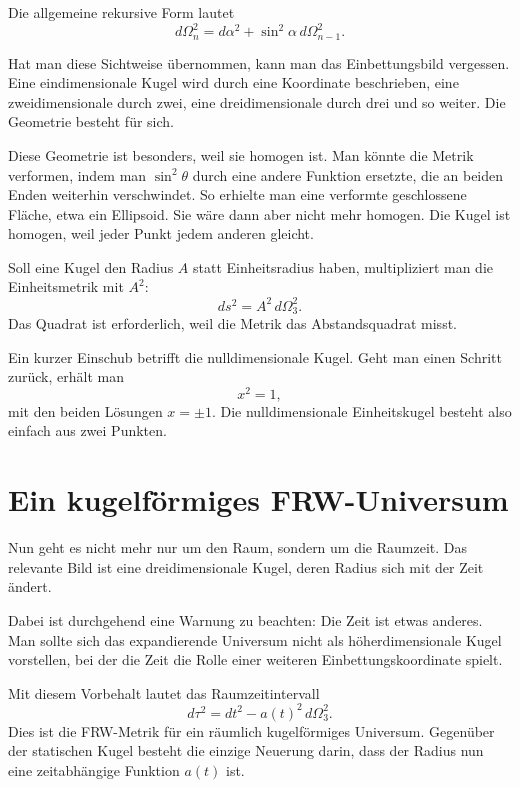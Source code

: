 Die allgemeine rekursive Form lautet
\begin{equation}
d\Omega_n^2=d\alpha^2+\sin^2\alpha\,d\Omega_{n-1}^2.
\end{equation}

Hat man diese Sichtweise übernommen, kann man das Einbettungsbild vergessen. Eine eindimensionale Kugel wird durch eine Koordinate beschrieben, eine zweidimensionale durch zwei, eine dreidimensionale durch drei und so weiter. Die Geometrie besteht für sich.

Diese Geometrie ist besonders, weil sie homogen ist. Man könnte die Metrik verformen, indem man \(\sin^2\theta\) durch eine andere Funktion ersetzte, die an beiden Enden weiterhin verschwindet. So erhielte man eine verformte geschlossene Fläche, etwa ein Ellipsoid. Sie wäre dann aber nicht mehr homogen. Die Kugel ist homogen, weil jeder Punkt jedem anderen gleicht.

Soll eine Kugel den Radius \(A\) statt Einheitsradius haben, multipliziert man die Einheitsmetrik mit \(A^2\):
\begin{equation}
ds^2=A^2\,d\Omega_3^2.
\end{equation}
Das Quadrat ist erforderlich, weil die Metrik das Abstandsquadrat misst.

Ein kurzer Einschub betrifft die nulldimensionale Kugel. Geht man einen Schritt zurück, erhält man
\begin{equation}
x^2=1,
\end{equation}
mit den beiden Lösungen \(x=\pm 1\). Die nulldimensionale Einheitskugel besteht also einfach aus zwei Punkten.

\section{Ein kugelförmiges FRW-Universum}

Nun geht es nicht mehr nur um den Raum, sondern um die Raumzeit. Das relevante Bild ist eine dreidimensionale Kugel, deren Radius sich mit der Zeit ändert.

Dabei ist durchgehend eine Warnung zu beachten: Die Zeit ist etwas anderes. Man sollte sich das expandierende Universum nicht als höherdimensionale Kugel vorstellen, bei der die Zeit die Rolle einer weiteren Einbettungskoordinate spielt.

Mit diesem Vorbehalt lautet das Raumzeitintervall
\begin{equation}
d\tau^2=dt^2-a(t)^2\,d\Omega_3^2.
\end{equation}
Dies ist die FRW-Metrik für ein räumlich kugelförmiges Universum. Gegenüber der statischen Kugel besteht die einzige Neuerung darin, dass der Radius nun eine zeitabhängige Funktion \(a(t)\) ist.

